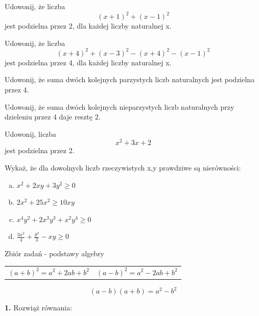 \documentclass[12pt,a4paper]{article}
\theoremstyle{break}
\begin{document}
	\begin{zad}
		Udowonij, że liczba
		$$(x+1)^2+(x-1)^2$$
		jest podzielna przez 2, dla każdej liczby naturalnej x.
	\end{zad}

	\begin{zad}
		Udowonij, że liczba
		$$(x+4)^2+(x-3)^2-(x+4)^2-(x-1)^2$$
		jest podzielna przez 4, dla każdej liczby naturalnej x.
	\end{zad}

	\begin{zad}
		Udowonij, że suma dwóch kolejnych parzystych liczb naturalnych jest podzielna przez 4.
	\end{zad}

	\begin{zad}
		Udowonij, że suma dwóch kolejnych nieparzystych liczb naturalnych przy dzieleniu przez 4 daje resztę 2.
	\end{zad}

	\begin{zad}
	Udowonij, liczba
	$$x^2+3x+2$$
	jest podzielna przez 2.
	\end{zad}

	\begin{zad}
		Wykaż, że dla dowolnych liczb rzeczywistych x,y prawdziwe są nierówności:
	\end{zad}
	\begin{enumerate}[a)]
		\item $x^2+2xy+3y^2\geq 0$
		\item $2x^2+25x^2\geq 10xy$
		\item $x^4y^2+2x^3y^3+x^2y^4\geq0$
		\item $\frac{3x^2}{4}+\frac{y^2}{3}-xy\geq0$
	\end{enumerate}

	\newpage

	\begin{center}
	\LARGE Zbiór zadań - podstawy algebry
	\end{center}
	\begin{mdframed}[style=wzor]
		\begin{tabular}{p{7cm} p{7cm}}
			\centering$(a+b)^2=a^2+2ab+b^2$&
			\centering$(a-b)^2=a^2-2ab+b^2$\\
		\end{tabular}
		$$(a-b)(a+b)=a^2-b^2$$
	\end{mdframed}

	\begin{mdframed}[style=zad]
		\vspace{0.2cm}
		\textbf{1.} Rozwiąż równania: 
	\end{mdframed}
\end{document}
